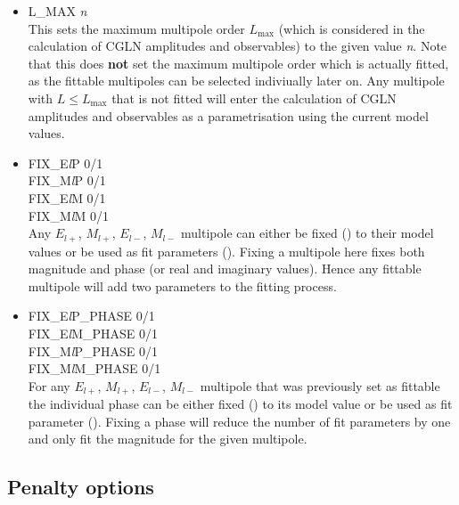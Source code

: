 \documentclass[a4paper,10pt]{article}
\def\tt{\ttfamily}
\def\rm{\rmfamily}
\begin{document}
\begin{itemize}
\item
\tt L\_MAX \textit{n}\rm\\
This sets the maximum multipole order $L_\mathrm{max}$ (which is considered in the calculation of CGLN amplitudes and observables)
to the given value \tt\textit{n}\rm.
Note that this does \textbf{not} set the maximum multipole order which is actually fitted, as the fittable multipoles
can be selected indiviually later on. Any multipole with $L \leq L_\mathrm{max}$ that is not fitted will enter
the calculation of CGLN amplitudes and observables as a parametrisation using the current model values.

\item
\tt FIX\_E\textit{l}P 0/1\rm\\
\tt FIX\_M\textit{l}P 0/1\rm\\
\tt FIX\_E\textit{l}M 0/1\rm\\
\tt FIX\_M\textit{l}M 0/1\rm\\
Any $E_{l+}$, $M_{l+}$, $E_{l-}$, $M_{l-}$ multipole can either be fixed (\tt1\rm) to their model values
or be used as fit parameters (\tt0\rm).
Fixing a multipole here fixes both magnitude and phase (or real and imaginary values).
Hence any fittable multipole will add two parameters to the fitting process.

\item
\tt FIX\_E\textit{l}P\_PHASE 0/1\rm\\
\tt FIX\_E\textit{l}M\_PHASE 0/1\rm\\
\tt FIX\_M\textit{l}P\_PHASE 0/1\rm\\
\tt FIX\_M\textit{l}M\_PHASE 0/1\rm\\
For any $E_{l+}$, $M_{l+}$, $E_{l-}$, $M_{l-}$ multipole that was previously set as fittable the individual
phase can be either fixed (\tt1\rm) to its model value or be used as fit parameter (\tt0\rm). Fixing a phase
will reduce the number of fit parameters by one and only fit the magnitude for the given multipole.

\end{itemize}

\subsection{Penalty options}
\end{document}
